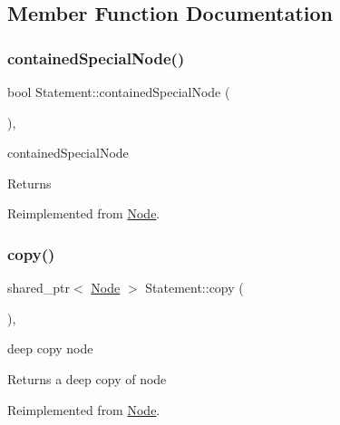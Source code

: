 \subsection{Member Function Documentation}
\mbox{\label{class_statement_a482a663d073d2601fa1759a5e651c240}} 
\subsubsection{\texorpdfstring{contained\+Special\+Node()}{containedSpecialNode()}}
{\footnotesize\ttfamily bool Statement\+::contained\+Special\+Node (\begin{DoxyParamCaption}{ }\end{DoxyParamCaption})\hspace{0.3cm}{\ttfamily [override]}, {\ttfamily [virtual]}}



contained\+Special\+Node 

\begin{DoxyReturn}{Returns}

\end{DoxyReturn}


Reimplemented from \hyperlink{class_node_ac76ac1cc0fd7376ca329f3e8279ebe1e}{Node}.

\mbox{\label{class_statement_a7d8bac78c76a6cf7265495da5b16935d}} 
\subsubsection{\texorpdfstring{copy()}{copy()}}
{\footnotesize\ttfamily shared\+\_\+ptr$<$ \hyperlink{class_node}{Node} $>$ Statement\+::copy (\begin{DoxyParamCaption}{ }\end{DoxyParamCaption})\hspace{0.3cm}{\ttfamily [override]}, {\ttfamily [virtual]}}



deep copy node 

\begin{DoxyReturn}{Returns}
a deep copy of node 
\end{DoxyReturn}


Reimplemented from \hyperlink{class_node_a0d22a418a622a24852610fd51910c5eb}{Node}.

